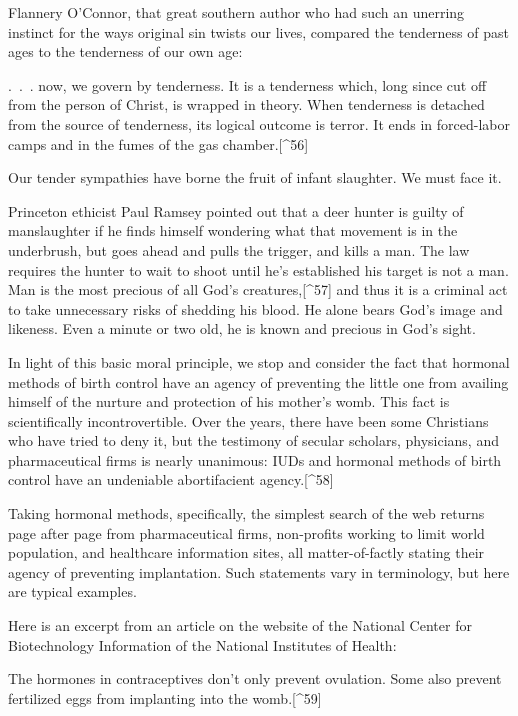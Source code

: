 \documentclass[
]{book}
\begin{document}
Flannery O'Connor, that great southern author who had such an unerring instinct for the ways original sin twists our lives, compared the tenderness of past ages to the tenderness of our own age:

.~.~. now, we govern by tenderness. It is a tenderness which, long since cut off from the person of Christ, is wrapped in theory. When tenderness is detached from the source of tenderness, its logical outcome is terror. It ends in forced-labor camps and in the fumes of the gas chamber.{[}\^{}56{]}

Our tender sympathies have borne the fruit of infant slaughter. We must face it.

Princeton ethicist Paul Ramsey pointed out that a deer hunter is guilty of manslaughter if he finds himself wondering what that movement is in the underbrush, but goes ahead and pulls the trigger, and kills a man. The law requires the hunter to wait to shoot until he's established his target is not a man. Man is the most precious of all God's creatures,{[}\^{}57{]} and thus it is a criminal act to take unnecessary risks of shedding his blood. He alone bears God's image and likeness. Even a minute or two old, he is known and precious in God's sight.

In light of this basic moral principle, we stop and consider the fact that hormonal methods of birth control have an agency of preventing the little one from availing himself of the nurture and protection of his mother's womb. This fact is scientifically incontrovertible. Over the years, there have been some Christians who have tried to deny it, but the testimony of secular scholars, physicians, and pharmaceutical firms is nearly unanimous: IUDs and hormonal methods of birth control have an undeniable abortifacient agency.{[}\^{}58{]}

Taking hormonal methods, specifically, the simplest search of the web returns page after page from pharmaceutical firms, non-profits working to limit world population, and healthcare information sites, all matter-of-factly stating their agency of preventing implantation. Such statements vary in terminology, but here are typical examples.

Here is an excerpt from an article on the website of the National Center for Biotechnology Information of the National Institutes of Health:

The hormones in contraceptives don't only prevent ovulation. Some also prevent fertilized eggs from implanting into the womb.{[}\^{}59{]}
\end{document}
